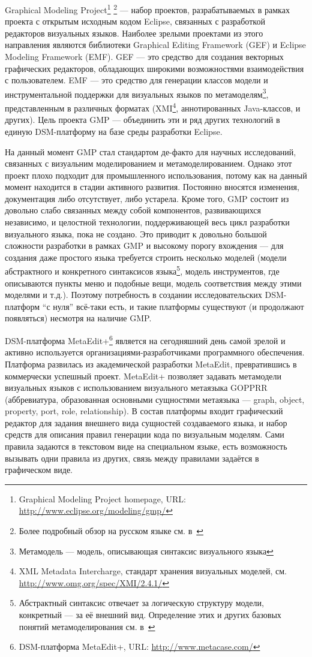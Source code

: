 \documentclass[a4, 12pt]{article}
\begin{document}
Graphical Modeling Project\footnote{Graphical Modeling Project homepage, URL: \url{http://www.eclipse.org/modeling/gmp/}} \footnote{Более подробный обзор на русском языке см. в~\cite{emp}} --- набор проектов, разрабатываемых в рамках проекта с открытым исходным кодом Eclipse, связанных с разработкой редакторов визуальных языков. Наиболее зрелыми проектами из этого направления являются библиотеки Graphical Editing Framework (GEF) и Eclipse Modeling Framework (EMF). GEF --- это средство для создания векторных графических редакторов, обладающих широкими возможностями взаимодействия с пользователем. EMF --- это средство для генерации классов модели и инструментальной поддержки для визуальных языков по метамоделям\footnote{Метамодель --- модель, описывающая синтаксис визуального языка}, представленным в различных форматах (XMI\footnote{XML Metadata Intercharge, стандарт хранения визуальных моделей, см. \url{http://www.omg.org/spec/XMI/2.4.1/}}, аннотированных Java-классов, и других). Цель проекта GMP --- 
объединить эти и ряд других технологий в единую DSM-платформу на базе среды разработки Eclipse.

На данный момент GMP стал стандартом де-факто для научных исследований, связанных с визуальним моделированием и метамоделированием. Однако этот проект плохо подходит для промышленного использования, потому как на данный момент находится в стадии активного развития. Постоянно вносятся изменения, документация либо отсутствует, либо устарела. Кроме того, GMP состоит из довольно слабо связанных между собой компонентов, развивающихся независимо, и целостной технологии, поддерживающей весь цикл разработки визуального языка, пока не создано. Это приводит к довольно большой сложности разработки в рамках GMP и высокому порогу вхождения --- для создания даже простого языка требуется строить несколько моделей (модели абстрактного и конкретного синтаксисов языка\footnote{Абстрактный синтаксис отвечает за логическую структуру модели, конкретный --- за её внешний вид. Определение этих и других базовых понятий метамоделирования см. в~\cite{koznov}}, модель инструментов, где описываются пункты меню и подобные вещи, модель 
соответствия между этими моделями и т.д.). Поэтому потребность в создании исследовательских DSM-платформ “с нуля” всё-таки есть, и такие платформы существуют (и продолжают появляться) несмотря на наличие GMP.

DSM-платформа MetaEdit+\footnote{DSM-платформа MetaEdit+, URL: \url{http://www.metacase.com/}} является на сегодняшний день самой зрелой и активно используется организациями-разработчиками программного обеспечения. Платформа развилась из академической разработки MetaEdit, превратившись в коммерчески успешный проект. MetaEdit+ позволяет задавать метамодели визуальных языков с использованием визуального метаязыка GOPPRR (аббревиатура, образованная основными сущностями метаязыка --- graph, object, property, port, role, relationship). В состав платформы входит графический редактор для задания внешнего вида сущностей создаваемого языка, и набор средств для описания правил генерации кода по визуальным моделям. Сами правила задаются в текстовом виде на специальном языке, есть возможность вызывать одни правила из других, связь между правилами задаётся в графическом виде.
\end{document}
